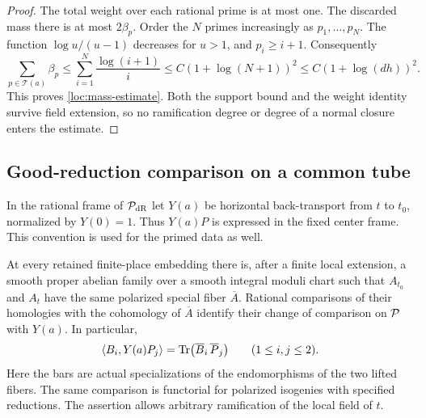 \begin{proof}
The total weight over each rational prime is at most one.  The discarded
mass there is at most $2\beta_p$.  Order the $N$ primes increasingly as
$p_1,\ldots,p_N$.  The function $\log u/(u-1)$ decreases for $u>1$, and
$p_i\geq i+1$.  Consequently
\begin{equation}\label{loc:prime-loss}
 \sum_{p\in\mathcal T(a)}\beta_p
 \leq\sum_{i=1}^N\frac{\log(i+1)}i
 \leq C(1+\log(N+1))^2
 \leq C(1+\log(dh))^2.
\end{equation}
This proves \eqref{loc:mass-estimate}.  Both the support bound and the
weight identity survive field extension, so no ramification degree or
degree of a normal closure enters the estimate.
\end{proof}

\subsection{Good-reduction comparison on a common tube}

In the rational frame of $\mathcal P_{\mathrm{dR}}$ let $Y(a)$ be horizontal
back-transport from $t$ to $t_0$, normalized by $Y(0)=1$.  Thus $Y(a)P$
is expressed in the fixed center frame.  This convention is used for
the primed data as well.

\begin{proposition}\label{loc:comparison}
At every retained finite-place embedding there is, after a finite local
extension, a smooth proper abelian family over a smooth integral
moduli chart such that $A_{t_0}$ and $A_t$ have the same polarized
special fiber $\overline A$.  Rational comparisons of their homologies
with the cohomology of $\overline A$ identify their change of comparison
on $\mathcal P$ with $Y(a)$.  In particular,
\begin{equation}\label{loc:common-traces}
 \langle B_i,Y(a)P_j\rangle
   =\operatorname{Tr}\bigl(\overline B_i\,\overline P_j\bigr)
 \qquad(1\leq i,j\leq2).
\end{equation}
Here the bars are actual specializations of the endomorphisms of the
two lifted fibers.  The same comparison is functorial for polarized
isogenies with specified reductions.  The assertion allows arbitrary
ramification of the local field of $t$.
\end{proposition}

